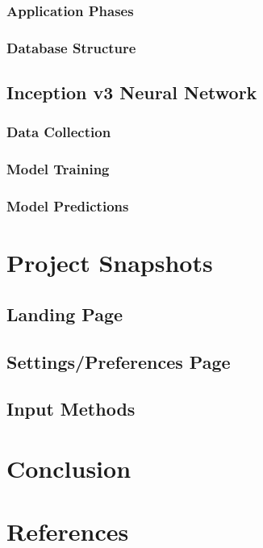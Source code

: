 \documentclass[14pt]{report}
\begin{document}
			\subsection{Application Phases}
			\subsection{Database Structure}
		
		\section{Inception v3 Neural Network}
			\subsection{Data Collection}
			\subsection{Model Training}
			\subsection{Model Predictions}


	\newpage


	\chapter{Project Snapshots}\label{chapter5}
		
	

		\section{Landing Page}
		\section{Settings/Preferences Page}
		\section{Input Methods}

	\newpage


	\chapter{Conclusion}\label{chapter6}
		
	

	\newpage


	\chapter*{References}\label{chapter7}
		
	

	\newpage
\end{document}
